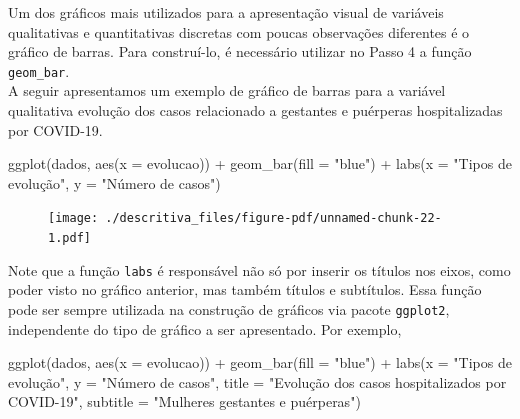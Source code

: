 \documentclass[
  letterpaper,
  DIV=11,
  numbers=noendperiod]{scrreprt}
\newenvironment{Shaded}{\begin{snugshade}}{\end{snugshade}}
\newcommand{\AttributeTok}[1]{\textcolor[rgb]{0.40,0.45,0.13}{#1}}
\newcommand{\FunctionTok}[1]{\textcolor[rgb]{0.28,0.35,0.67}{#1}}
\newcommand{\NormalTok}[1]{\textcolor[rgb]{0.00,0.23,0.31}{#1}}
\newcommand{\SpecialCharTok}[1]{\textcolor[rgb]{0.37,0.37,0.37}{#1}}
\newcommand{\StringTok}[1]{\textcolor[rgb]{0.13,0.47,0.30}{#1}}
\begin{document}
Um dos gráficos mais utilizados para a apresentação visual de variáveis
qualitativas e quantitativas discretas com poucas observações diferentes
é o gráfico de barras. Para construí-lo, é necessário utilizar no Passo
4 a função \texttt{geom\_bar}.\\
A seguir apresentamos um exemplo de gráfico de barras para a variável
qualitativa evolução dos casos relacionado a gestantes e puérperas
hospitalizadas por COVID-19.

\begin{Shaded}
\begin{Highlighting}[]
\FunctionTok{ggplot}\NormalTok{(dados, }\FunctionTok{aes}\NormalTok{(}\AttributeTok{x =}\NormalTok{ evolucao)) }\SpecialCharTok{+}
  \FunctionTok{geom\_bar}\NormalTok{(}\AttributeTok{fill =} \StringTok{"blue"}\NormalTok{) }\SpecialCharTok{+}
  \FunctionTok{labs}\NormalTok{(}\AttributeTok{x =} \StringTok{"Tipos de evolução"}\NormalTok{, }\AttributeTok{y =} \StringTok{"Número de casos"}\NormalTok{)}
\end{Highlighting}
\end{Shaded}

\begin{figure}[H]

{\centering \texttt{[image: ./descritiva\_files/figure-pdf/unnamed-chunk-22-1.pdf]}

}

\end{figure}

Note que a função \texttt{labs} é responsável não só por inserir os
títulos nos eixos, como poder visto no gráfico anterior, mas também
títulos e subtítulos. Essa função pode ser sempre utilizada na
construção de gráficos via pacote \texttt{ggplot2}, independente do tipo
de gráfico a ser apresentado. Por exemplo,

\begin{Shaded}
\begin{Highlighting}[]
\FunctionTok{ggplot}\NormalTok{(dados, }\FunctionTok{aes}\NormalTok{(}\AttributeTok{x =}\NormalTok{ evolucao)) }\SpecialCharTok{+}
  \FunctionTok{geom\_bar}\NormalTok{(}\AttributeTok{fill =} \StringTok{"blue"}\NormalTok{) }\SpecialCharTok{+}
  \FunctionTok{labs}\NormalTok{(}\AttributeTok{x =} \StringTok{"Tipos de evolução"}\NormalTok{, }\AttributeTok{y =} \StringTok{"Número de casos"}\NormalTok{, }\AttributeTok{title =} \StringTok{"Evolução dos casos hospitalizados por COVID{-}19"}\NormalTok{, }\AttributeTok{subtitle =} \StringTok{"Mulheres gestantes e puérperas"}\NormalTok{)}
\end{Highlighting}
\end{Shaded}
\end{document}
